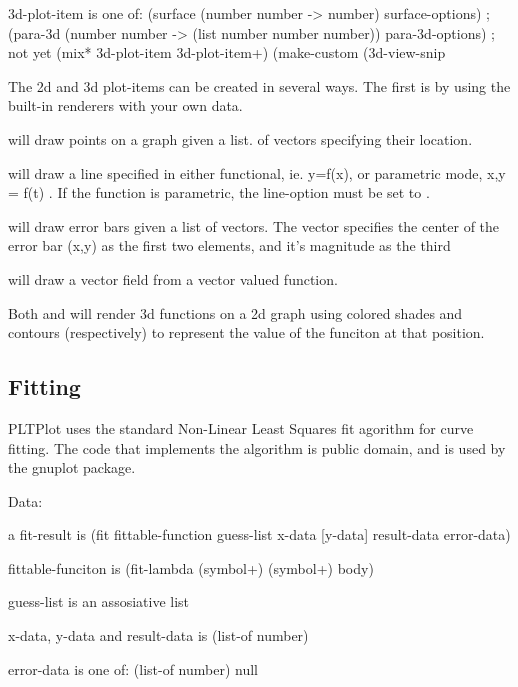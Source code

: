 \documentclass{article}
\begin{document}
{{{\begin{schemedisplay}
3d-plot-item is one of:
 (surface (number number -> number) surface-options)
 ;(para-3d (number number -> (list number number number)) para-3d-options) ; not yet
 (mix* 3d-plot-item 3d-plot-item+)
 (make-custom (3d-view-snip%
     
\end{schemedisplay}



The 2d and 3d plot-items can be created in several ways. The first is by using the built-in renderers with your own data. 


 will draw points on a graph given a list. of vectors specifying their location. 


 will draw a line specified in either functional, ie. y=f(x), or  parametric mode, x,y = f(t) . If the function is parametric, the line-option  must be set to .


 will draw error bars given a list of vectors. The vector specifies the  center of the error bar (x,y) as the first two elements, and it's magnitude as the third


 will draw a vector field from a vector valued function.


Both  and  will render 3d functions on a 2d graph using colored shades and contours (respectively) to represent the value of the funciton at that position.

\subsection{Fitting}


PLTPlot uses the standard Non-Linear Least Squares fit agorithm for curve fitting. The code that implements the algorithm is public domain, and is used by the gnuplot package.



\begin{schemedisplay}

Data:
       
a fit-result is 
  (fit fittable-function guess-list x-data [y-data] result-data error-data)       
  
fittable-funciton is
  (fit-lambda (symbol+) (symbol+) body)
  
guess-list is an assosiative list
  
x-data, y-data and result-data is
  (list-of number)
  
error-data is one of:
  (list-of number)
  null
  

\end{schemedisplay}}}}
\end{document}
